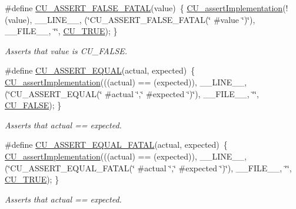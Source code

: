 \begin{DoxyCompactItemize}
\#define \hyperlink{group__Framework_ga3929ac93488edb4fc9d59695173cf5ae}{C\-U\-\_\-\-A\-S\-S\-E\-R\-T\-\_\-\-F\-A\-L\-S\-E\-\_\-\-F\-A\-T\-A\-L}(value)~\{ \hyperlink{group__Framework_ga31a858e8b496b2af992b63902064c5fa}{C\-U\-\_\-assert\-Implementation}(!(value), \-\_\-\-\_\-\-L\-I\-N\-E\-\_\-\-\_\-, (\char`\"{}C\-U\-\_\-\-A\-S\-S\-E\-R\-T\-\_\-\-F\-A\-L\-S\-E\-\_\-\-F\-A\-T\-A\-L(\char`\"{} \#value \char`\"{})\char`\"{}), \-\_\-\-\_\-\-F\-I\-L\-E\-\_\-\-\_\-, \char`\"{}\char`\"{}, \hyperlink{group__Framework_ga99641394bc766ca9c4a295e942fed1ef}{C\-U\-\_\-\-T\-R\-U\-E}); \}
\begin{DoxyCompactList}\small\item\em Asserts that value is C\-U\-\_\-\-F\-A\-L\-S\-E. \end{DoxyCompactList}\item 
\#define \hyperlink{group__Framework_ga6f281701c682225d34636081cbd0fe9d}{C\-U\-\_\-\-A\-S\-S\-E\-R\-T\-\_\-\-E\-Q\-U\-A\-L}(actual, expected)~\{ \hyperlink{group__Framework_ga31a858e8b496b2af992b63902064c5fa}{C\-U\-\_\-assert\-Implementation}(((actual) == (expected)), \-\_\-\-\_\-\-L\-I\-N\-E\-\_\-\-\_\-, (\char`\"{}C\-U\-\_\-\-A\-S\-S\-E\-R\-T\-\_\-\-E\-Q\-U\-A\-L(\char`\"{} \#actual \char`\"{},\char`\"{} \#expected \char`\"{})\char`\"{}), \-\_\-\-\_\-\-F\-I\-L\-E\-\_\-\-\_\-, \char`\"{}\char`\"{}, \hyperlink{group__Framework_ga7453214541b156ef868681eaafe60860}{C\-U\-\_\-\-F\-A\-L\-S\-E}); \}
\begin{DoxyCompactList}\small\item\em Asserts that actual == expected. \end{DoxyCompactList}\item 
\#define \hyperlink{group__Framework_ga186009e7fdcfcde884e5d2d41ebac2ea}{C\-U\-\_\-\-A\-S\-S\-E\-R\-T\-\_\-\-E\-Q\-U\-A\-L\-\_\-\-F\-A\-T\-A\-L}(actual, expected)~\{ \hyperlink{group__Framework_ga31a858e8b496b2af992b63902064c5fa}{C\-U\-\_\-assert\-Implementation}(((actual) == (expected)), \-\_\-\-\_\-\-L\-I\-N\-E\-\_\-\-\_\-, (\char`\"{}C\-U\-\_\-\-A\-S\-S\-E\-R\-T\-\_\-\-E\-Q\-U\-A\-L\-\_\-\-F\-A\-T\-A\-L(\char`\"{} \#actual \char`\"{},\char`\"{} \#expected \char`\"{})\char`\"{}), \-\_\-\-\_\-\-F\-I\-L\-E\-\_\-\-\_\-, \char`\"{}\char`\"{}, \hyperlink{group__Framework_ga99641394bc766ca9c4a295e942fed1ef}{C\-U\-\_\-\-T\-R\-U\-E}); \}
\begin{DoxyCompactList}\small\item\em Asserts that actual == expected. \end{DoxyCompactList}\item 

\end{DoxyCompactItemize}
